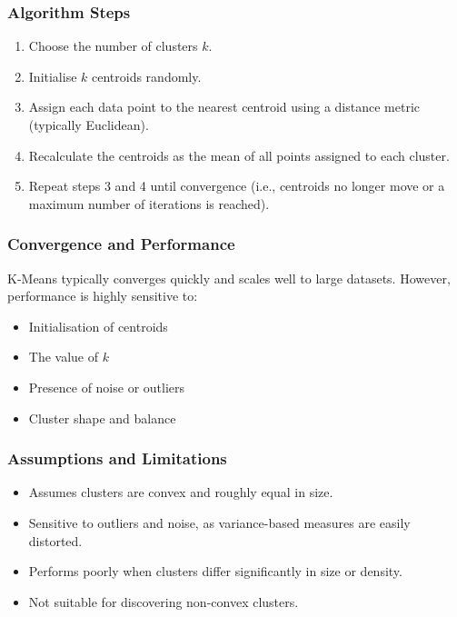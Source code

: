 \documentclass[9pt]{extarticle}
\begin{document}
\subsubsection{Algorithm Steps}

\begin{enumerate}
    \item Choose the number of clusters $k$.
    \item Initialise $k$ centroids randomly.
    \item Assign each data point to the nearest centroid using a distance metric (typically Euclidean).
    \item Recalculate the centroids as the mean of all points assigned to each cluster.
    \item Repeat steps 3 and 4 until convergence (i.e., centroids no longer move or a maximum number of iterations is reached).
\end{enumerate}

\subsubsection{Convergence and Performance}

K-Means typically converges quickly and scales well to large datasets. However, performance is highly sensitive to:
\begin{itemize}
    \item Initialisation of centroids
    \item The value of $k$
    \item Presence of noise or outliers
    \item Cluster shape and balance
\end{itemize}

\subsubsection{Assumptions and Limitations}

\begin{itemize}
    \item Assumes clusters are convex and roughly equal in size.
    \item Sensitive to outliers and noise, as variance-based measures are easily distorted.
    \item Performs poorly when clusters differ significantly in size or density.
    \item Not suitable for discovering non-convex clusters.
\end{itemize}
\end{document}
